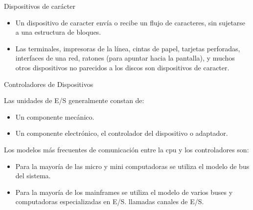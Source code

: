 \documentclass{beamer}
\begin{document}
\begin{frame}{Dispositivos de carácter}
    \begin{itemize}
        
    \item Un dispositivo de caracter envía o recibe un flujo de caracteres, sin sujetarse a una estructura de bloques.
    
    \item Las terminales, impresoras de la línea, cintas de papel, tarjetas perforadas, interfaces de una red, ratones (para apuntar hacia la pantalla), y muchos otros dispositivos no parecidos a los discos son dispositivos de caracter.
    
    \end{itemize}
\end{frame}


\begin{frame}{Controladores de Dispositivos}
  \begin{block}{Las unidades de E/S generalmente constan de:}
    \begin{itemize}
      \item Un componente mecánico.
      \item Un componente electrónico, el controlador del dispositivo o adaptador.  
    \end{itemize}
  \end{block}
  
  \begin{block}{Los modelos más frecuentes de comunicación
entre la cpu y los controladores son:}

    \begin{itemize}
        \item Para la mayoría de las micro y mini computadoras se
        utiliza el modelo de bus del sistema.
        \item Para la mayoría de los mainframes se utiliza el modelo
        de varios buses y computadoras especializadas en E/S.
        llamadas canales de E/S.
    \end{itemize}

  \end{block}
\end{frame}
\end{document}
